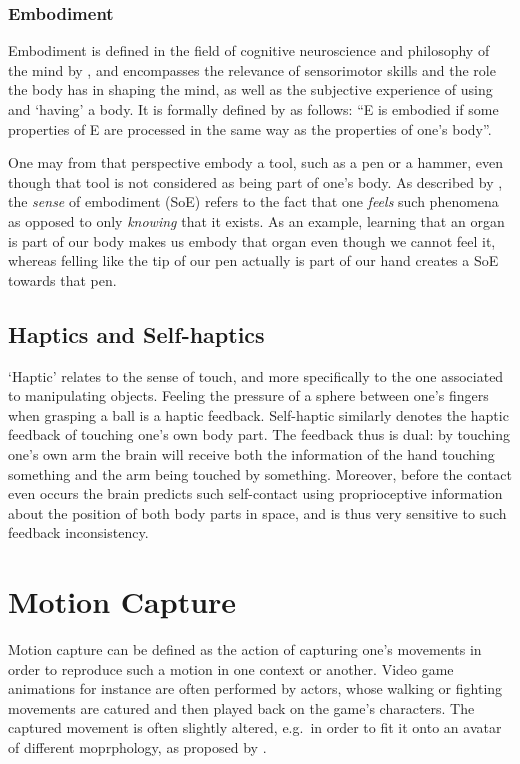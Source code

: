 \subsubsection{Embodiment}
\label{sec:embodiment}
Embodiment is defined in the field of cognitive neuroscience and philosophy of the mind by \cite{blanke2009full,debarba2017embodiment}, and encompasses the relevance of sensorimotor skills and the role the body has in shaping the mind, as well as the subjective experience of using and `having' a body. It is formally defined by \cite{de2011embodiment} as follows: ``E is embodied if some properties of E are processed in the same way as the properties of one’s body''.

One may from that perspective embody a tool, such as a pen or a hammer, even though that tool is not considered as being part of one's body. As described by \cite{de2011embodiment}, the \textit{sense} of embodiment (SoE) refers to the fact that one \textit{feels} such phenomena as opposed to only \textit{knowing} that it exists. As an example, learning that an organ is part of our body makes us embody that organ even though we cannot feel it, whereas felling like the tip of our pen actually is part of our hand creates a SoE towards that pen.

\subsection{Haptics and Self-haptics}

`Haptic' relates to the sense of touch, and more specifically to the one associated to manipulating objects. Feeling the pressure of a sphere between one's fingers when grasping a ball is a haptic feedback. Self-haptic similarly denotes the haptic feedback of touching one's own body part. The feedback thus is dual: by touching one's own arm the brain will receive both the information of the hand touching something and the arm being touched by something. Moreover, before the contact even occurs the brain predicts such self-contact using proprioceptive information about the position of both body parts in space, and is thus very sensitive to such feedback inconsistency.

\section{Motion Capture}
\label{sec:mocap}
Motion capture can be defined as the action of capturing one's movements in order to reproduce such a motion in one context or another. Video game animations for instance are often performed by actors, whose walking or fighting movements are catured and then played back on the game's characters. The captured movement is often slightly altered, e.g.\ in order to fit it onto an avatar of different moprphology, as proposed by \cite{molla2017egocentric}.

